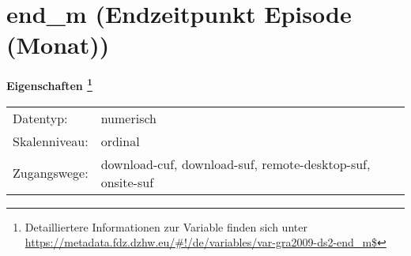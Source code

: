 
    \setcounter{footnote}{0}

    \vspace*{-1.8cm}
	\section{end\_m (Endzeitpunkt Episode (Monat))}
	\label{section:end_m}



    \vspace*{0.5cm}
    \noindent\textbf{Eigenschaften
	\footnote{Detailliertere Informationen zur Variable finden sich unter
		\url{https://metadata.fdz.dzhw.eu/\#!/de/variables/var-gra2009-ds2-end_m$}}}\\
	\begin{tabularx}{\hsize}{@{}lX}
	Datentyp: & numerisch \\
	Skalenniveau: & ordinal \\
	Zugangswege: &
	  download-cuf, 
	  download-suf, 
	  remote-desktop-suf, 
	  onsite-suf
 \\
    \end{tabularx}



